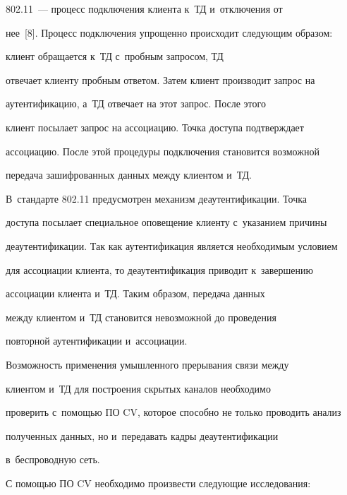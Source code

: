 802.11~--- процесс подключения клиента к~ТД и~отключения от


нее~[8]. Процесс подключения упрощенно происходит следующим образом:


клиент обращается к~ТД с~пробным запросом, ТД


отвечает клиенту пробным ответом. Затем клиент производит запрос на


аутентификацию, а~ТД отвечает на этот запрос. После этого


клиент посылает запрос на ассоциацию. Точка доступа подтверждает


ассоциацию. После этой процедуры подключения становится возможной


передача зашифрованных данных между клиентом и~ТД.


В~стандарте 802.11 предусмотрен механизм деаутентификации. Точка


доступа посылает специальное оповещение клиенту с~указанием причины


деаутентификации. Так как аутентификация является необходимым условием


для ассоциации клиента, то деаутентификация приводит к~завершению


ассоциации клиента и~ТД. Таким образом, передача данных


между клиентом и~ТД становится невозможной до проведения


повторной аутентификации и~ассоциации.





  Возможность применения умышленного прерывания связи между


клиентом и~ТД для построения скрытых каналов необходимо


проверить с~по\-мощью ПО CV, которое способно не только проводить анализ


полученных данных, но и~передавать кадры деаутентификации


в~беспроводную сеть.





  С помощью ПО CV необходимо произвести следующие исследования:


